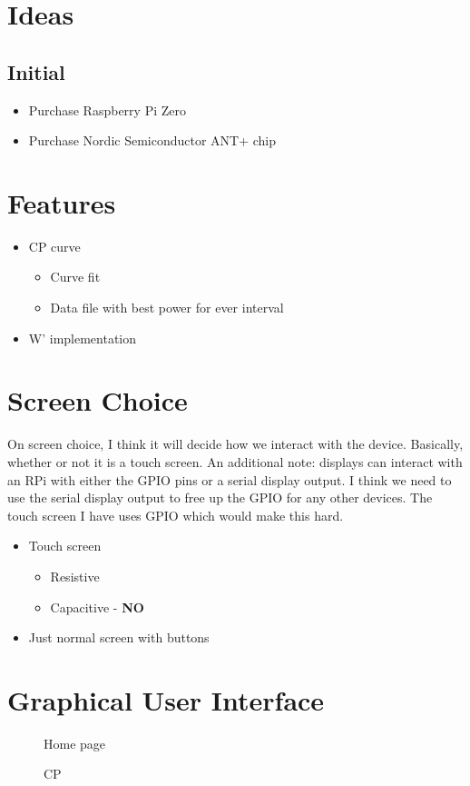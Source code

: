 \documentclass[letterpaper]{article}
\begin{document}
\section{Ideas}

\subsection{Initial}


\begin{itemize}
   \item Purchase Raspberry Pi Zero
   \item Purchase Nordic Semiconductor ANT+ chip
\end{itemize}


\section{Features}
\begin{itemize}
   \item CP curve
   \begin{itemize}
      \item Curve fit
      \item Data file with best power for ever interval
   \end{itemize}
   \item W' implementation
\end{itemize}



\section{Screen Choice}
On screen choice, I think it will decide how we interact with the device. Basically, whether or not it is a touch screen. An additional note: displays can interact with an RPi with either the GPIO pins or a serial display output. I think we need to use the serial display output to free up the GPIO for any other devices. The touch screen I have uses GPIO which would make this hard. 

\begin{itemize}
   \item Touch screen
      \begin{itemize}
         \item Resistive
         \item Capacitive - \textbf{NO}
      \end{itemize}
   \item Just normal screen with buttons
\end{itemize}

\section{Graphical User Interface}

\begin{figure}[!htb]
\centering
\begin{minipage}{.49\textwidth}
\centering

\caption{Home page}
\end{minipage} \hfill
\begin{minipage}{.49\textwidth}
\centering

\caption{CP}
\end{minipage}
\end{figure}
\end{document}
